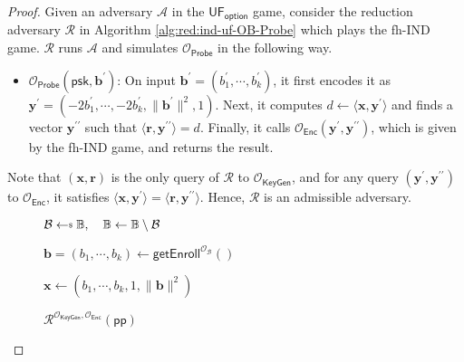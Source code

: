 \begin{proof}

Given an adversary $\mathcal{A}$ in the $\textsf{UF}_\textsf{option}$ game, consider the reduction adversary $\mathcal{R}$ in Algorithm \ref{alg:red:ind-uf-OB-Probe} which plays the \textsf{fh-IND} game. $\mathcal{R}$ runs $\mathcal{A}$ and simulates $\mathcal{O}_{\textsf{Probe}}$ in the following way.

\begin{itemize}

	\item $\mathcal{O}_{\textsf{Probe}}( \textsf{psk}, \mathbf{b}^\prime )$: On input $\mathbf{b}^\prime = (b_1^\prime, \cdots, b_k^\prime)$, it first encodes it as $\mathbf{y}^\prime = (-2b_1^\prime, \cdots, \allowbreak -2b_k^\prime, \|\mathbf{b}^\prime\|^2, 1)$. Next, it computes $d \gets \langle \mathbf{x}, {\mathbf{y}^\prime} \rangle$ and finds a vector $\mathbf{y}^{\prime\prime}$ such that $\langle \mathbf{r}, {\mathbf{y}^{\prime\prime}} \rangle = d$. Finally, it calls $\mathcal{O}_{\textsf{Enc}}(\mathbf{y}^\prime, {\mathbf{y}^{\prime\prime}})$, which is given by the \textsf{fh-IND} game, and returns the result.

\end{itemize}

\noindent Note that $(\mathbf{x}, \mathbf{r})$ is the only query of $\mathcal{R}$ to $\mathcal{O}_{\textsf{KeyGen}}$, and for any query $( \mathbf{y}^\prime, {\mathbf{y}^{\prime\prime}} )$ to $\mathcal{O}_{\textsf{Enc}}$, it satisfies $\langle \mathbf{x}, {\mathbf{y}^\prime} \rangle = \langle \mathbf{r}, {\mathbf{y}^{\prime\prime}} \rangle$. Hence, $\mathcal{R}$ is an admissible adversary.

\begin{figure}[h]
\centering
	
	\begin{minipage}[t]{0.6\linewidth}
	\centering
	\begin{algorithm}[H]
	\caption{$\mathcal{R}^{\mathcal{O}_{\textsf{KeyGen}}, \mathcal{O}_{\textsf{Enc}}}(\textsf{pp})$}
	\label{alg:red:ind-uf-OB-Probe}
	\begin{algorithmic}[1]
		\State $\mathcal{B} \getsdollar \mathbb{B}, \quad \mathbb{B} \gets \mathbb{B} \setminus \mathcal{B}$ \label{alg:red:ind-uf-OB-Probe:B}

		\State $\mathbf{b} = (b_1, \cdots, b_k) \gets \textsf{getEnroll}^{\mathcal{O}_{\mathcal{B}}}()$

		\State $\mathbf{x} \gets (b_1, \cdots, b_k, 1, \|\mathbf{b}\|^2)$


\end{algorithmic}
\end{algorithm}
\end{minipage}
\end{figure}
\end{proof}
